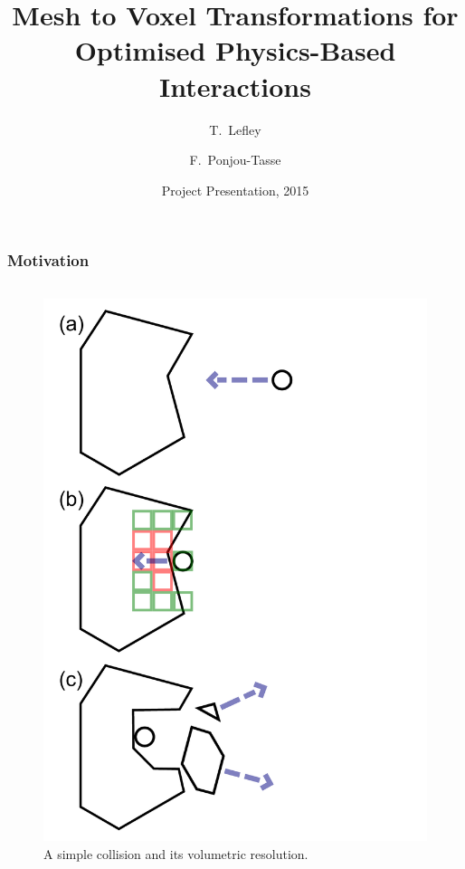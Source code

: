 \documentclass{beamer}
\begin{document}
	\title[Crisis] %
	{Mesh to Voxel Transformations for Optimised Physics-Based Interactions}
	\subtitle{}
	\author[Lefley, Ponjou-Tasse] %
	{T.~Lefley \and F.~Ponjou-Tasse}

	\date[2015] %
	{Project Presentation, 2015}
	\subject{Computer Science}

	\frame{\titlepage}

	\begin{frame}
	\frametitle{Motivation}
		\begin{columns}[T] %
			\begin{column}[T]{5cm} %
				\begin{figure}
					\centerline{\includegraphics[scale=0.2]{diagram.pdf}}
					\caption{A simple collision and its volumetric resolution.}

\end{figure}
\end{column}
\end{columns}
\end{frame}
\end{document}
